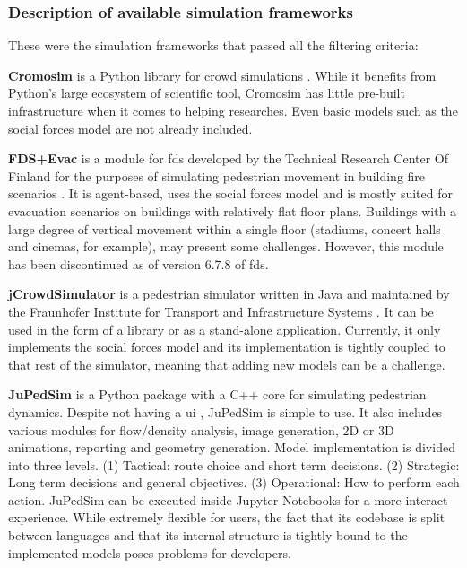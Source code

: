\documentclass[twoside, 11pt]{article}
\begin{document}
\subsubsection{Description of available simulation frameworks}

These were the simulation frameworks that passed all the filtering criteria:

\textbf{Cromosim} is a Python library for crowd simulations \cite{cromosim}. While it benefits from Python's large ecosystem of scientific tool, Cromosim has little pre-built infrastructure when it comes to helping researches. Even basic models such as the social forces model are not already included.

\textbf{FDS+Evac} is a module for \gls{fds} developed by the Technical Research Center Of Finland for the purposes of simulating pedestrian movement in building fire scenarios \cite{korhonenFireDynamicsSimulator2009}. It is agent-based, uses the social forces model and is mostly suited for evacuation scenarios on buildings with relatively flat floor plans. Buildings with a large degree of vertical movement within a single floor (stadiums, concert halls and cinemas, for example), may present some challenges. However, this module has been discontinued as of version 6.7.8 of \gls{fds}.

\textbf{jCrowdSimulator} is a pedestrian simulator written in Java and maintained by the Fraunhofer Institute for Transport and Infrastructure Systems \cite{meinert2019simulation}. It can be used in the form of a library or as a stand-alone application. Currently, it only implements the social forces model and its implementation is tightly coupled to that rest of the simulator, meaning that adding new models can be a challenge.

\textbf{JuPedSim} is a Python package with a C++ core for simulating pedestrian dynamics. Despite not having a \gls{ui} \cite{kemlohwagoumJuPedSimOpenFramework2015}, JuPedSim is simple to use. It also includes various modules for flow/density analysis, image generation, 2D or 3D animations, reporting and geometry generation. Model implementation is divided into three levels. (1) Tactical: route choice and short term decisions. (2) Strategic: Long term decisions and general objectives. (3) Operational: How to perform each action. JuPedSim can be executed inside Jupyter Notebooks for a more interact experience. While extremely flexible for users, the fact that its codebase is split between languages and that its internal structure is tightly bound to the implemented models poses problems for developers.
\end{document}
